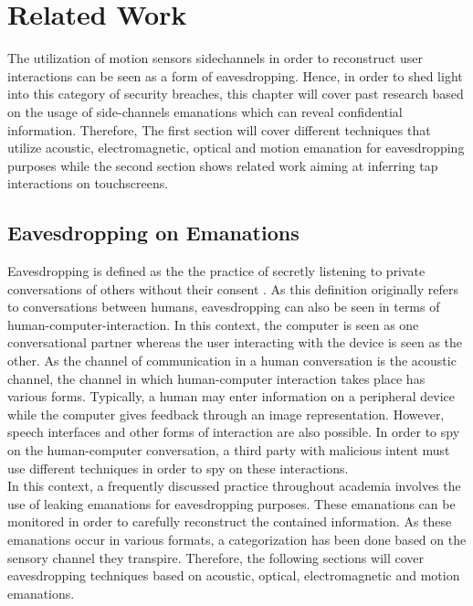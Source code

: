 \chapter{Related Work\label{cha:chapter2}}
The utilization of motion sensors sidechannels in order to reconstruct user interactions can be seen as a form of eavesdropping. Hence, in order to shed light into this category of security breaches, this chapter will cover past research based on the usage of side-channels emanations which can reveal confidential information. Therefore, The first section will cover different techniques that utilize acoustic, electromagnetic, optical and motion emanation for eavesdropping purposes while the second section shows related work aiming at inferring tap interactions on touchscreens.

\section{Eavesdropping on Emanations}

Eavesdropping is defined as the the practice of secretly listening to private conversations of others without their consent \cite{black1990black}. As this definition originally refers to conversations between humans, eavesdropping can also be seen in terms of human-computer-interaction. In this context, the computer is seen as one conversational partner whereas the user interacting with the device is seen as the other. As the channel of communication in a human conversation is the acoustic channel, the channel in which human-computer interaction takes place has various forms. Typically, a human may enter information on a peripheral device while the computer gives feedback through an image representation. However, speech interfaces and other forms of interaction are also possible. In order to spy on the human-computer conversation, a third party with malicious intent must use different techniques in order to spy on these interactions.\\

In this context, a frequently discussed practice throughout academia involves the use of leaking emanations for eavesdropping purposes. These emanations can be monitored in order to carefully reconstruct the contained information. As these emanations occur in various formats, a categorization has been done based on the sensory channel they transpire. Therefore, the following sections will cover eavesdropping techniques based on acoustic, optical, electromagnetic and motion emanations.

